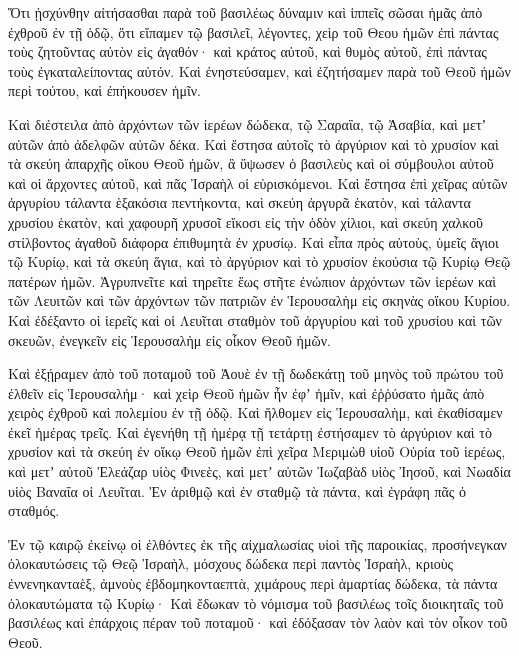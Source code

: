 {Ὅτι ᾐσχύνθην αἰτήσασθαι παρὰ τοῦ βασιλέως δύναμιν καὶ ἱππεῖς σῶσαι ἡμᾶς ἀπὸ ἐχθροῦ ἐν τῇ ὁδῷ, ὅτι εἴπαμεν τῷ βασιλεῖ, λέγοντες, χεὶρ τοῦ Θεου ἡμῶν ἐπὶ πάντας τοὺς ζητοῦντας αὐτὸν εἰς ἀγαθόν· καὶ κράτος αὐτοῦ, καὶ θυμὸς αὐτοῦ, ἐπὶ πάντας τοὺς ἐγκαταλείποντας αὐτόν.
Καὶ ἐνηστεύσαμεν, καὶ ἐζητήσαμεν παρὰ τοῦ Θεοῦ ἡμῶν περὶ τούτου, καὶ ἐπήκουσεν ἡμῖν.
\par }{\PP {}Καὶ διέστειλα ἀπὸ ἀρχόντων τῶν ἱερέων δώδεκα, τῷ Σαραΐα, τῷ Ἀσαβία, καὶ μετʼ αὐτῶν ἀπὸ ἀδελφῶν αὐτῶν δέκα.
Καὶ ἔστησα αὐτοῖς τὸ ἀργύριον καὶ τὸ χρυσίον καὶ τὰ σκεύη ἀπαρχῆς οἴκου Θεοῦ ἡμῶν, ἃ ὕψωσεν ὁ βασιλεὺς καὶ οἱ σύμβουλοι αὐτοῦ καὶ οἱ ἄρχοντες αὐτοῦ, καὶ πᾶς Ἰσραὴλ οἱ εὑρισκόμενοι.
Καὶ ἔστησα ἐπὶ χεῖρας αὐτῶν ἀργυρίου τάλαντα ἑξακόσια πεντήκοντα, καὶ σκεύη ἀργυρᾶ ἑκατὸν, καὶ τάλαντα χρυσίου ἑκατὸν,
καὶ χαφουρῆ χρυσοῖ εἴκοσι εἰς τὴν ὁδὸν χίλιοι, καὶ σκεύη χαλκοῦ στίλβοντος ἀγαθοῦ διάφορα ἐπιθυμητὰ ἐν χρυσίῳ.
Καὶ εἶπα πρὸς αὐτοὺς, ὑμεῖς ἅγιοι τῷ Κυρίῳ, καὶ τὰ σκεύη ἅγια, καὶ τὸ ἀργύριον καὶ τὸ χρυσίον ἑκούσια τῷ Κυρίῳ Θεῷ πατέρων ἡμῶν.
Ἀγρυπνεῖτε καὶ τηρεῖτε ἕως στῆτε ἐνώπιον ἀρχόντων τῶν ἱερέων καὶ τῶν Λευιτῶν καὶ τῶν ἀρχόντων τῶν πατριῶν ἐν Ἱερουσαλὴμ εἰς σκηνὰς οἴκου Κυρίου.
Καὶ ἐδέξαντο οἱ ἱερεῖς καὶ οἱ Λευῖται σταθμὸν τοῦ ἀργυρίου καὶ τοῦ χρυσίου καὶ τῶν σκευῶν, ἐνεγκεῖν εἰς Ἱερουσαλὴμ εἰς οἶκον Θεοῦ ἡμῶν.
\par }{\PP {}Καὶ ἐξῄραμεν ἀπὸ τοῦ ποταμοῦ τοῦ Ἀουὲ ἐν τῇ δωδεκάτῃ τοῦ μηνὸς τοῦ πρώτου τοῦ ἐλθεῖν εἰς Ἱερουσαλήμ· καὶ χεὶρ Θεοῦ ἡμῶν ἦν ἐφʼ ἡμῖν, καὶ ἐῤῥύσατο ἡμᾶς ἀπὸ χειρὸς ἐχθροῦ καὶ πολεμίου ἐν τῇ ὁδῷ.
Καὶ ἤλθομεν εἰς Ἱερουσαλὴμ, καὶ ἐκαθίσαμεν ἐκεῖ ἡμέρας τρεῖς.
Καὶ ἐγενήθη τῇ ἡμέρᾳ τῇ τετάρτῃ ἐστήσαμεν τὸ ἀργύριον καὶ τὸ χρυσίον καὶ τὰ σκεύη ἐν οἴκῳ Θεοῦ ἡμῶν ἐπὶ χεῖρα Μεριμὼθ υἱοῦ Οὐρία τοῦ ἱερέως, καὶ μετʼ αὐτοῦ Ἐλεάζαρ υἱὸς Φινεὲς, καὶ μετʼ αὐτῶν Ἰωζαβὰδ υἱὸς Ἰησοῦ, καὶ Νωαδία υἱὸς Βαναΐα οἱ Λευῖται.
Ἐν ἀριθμῷ καὶ ἐν σταθμῷ τὰ πάντα, καὶ ἐγράφη πᾶς ὁ σταθμός.
\par }{\PP {}Ἐν τῷ καιρῷ ἐκείνῳ οἱ ἐλθόντες ἐκ τῆς αἰχμαλωσίας υἱοὶ τῆς παροικίας, προσήνεγκαν ὁλοκαυτώσεις τῷ Θεῷ Ἰσραὴλ, μόσχους δώδεκα περὶ παντὸς Ἰσραὴλ, κριοὺς ἐννενηκανταὲξ, ἀμνοὺς ἑβδομηκονταεπτὰ, χιμάρους περὶ ἁμαρτίας δώδεκα, τὰ πάντα ὁλοκαυτώματα τῷ Κυρίῳ·
Καὶ ἔδωκαν τὸ νόμισμα τοῦ βασιλέως τοῖς διοικηταῖς τοῦ βασιλέως καὶ ἐπάρχοις πέραν τοῦ ποταμοῦ· καὶ ἐδόξασαν τὸν λαὸν καὶ τὸν οἶκον τοῦ Θεοῦ.

}
